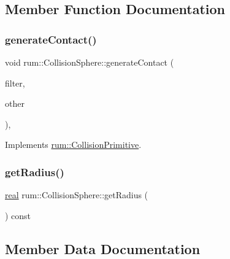 \subsection{Member Function Documentation}
\mbox{\label{classrum_1_1_collision_sphere_a4101051ee3213ce5257adcabd1529c00}} 
\subsubsection{\texorpdfstring{generate\+Contact()}{generateContact()}}
{\footnotesize\ttfamily void rum\+::\+Collision\+Sphere\+::generate\+Contact (\begin{DoxyParamCaption}\item[{\mbox{\hyperlink{classrum_1_1_i_narrow_phase_filter}{I\+Narrow\+Phase\+Filter}} $\ast$}]{filter,  }\item[{\mbox{\hyperlink{classrum_1_1_collision_primitive}{Collision\+Primitive}} $\ast$}]{other }\end{DoxyParamCaption})\hspace{0.3cm}{\ttfamily [override]}, {\ttfamily [virtual]}}



Implements \mbox{\hyperlink{classrum_1_1_collision_primitive_a31af51e97485378954de219b8411a27d}{rum\+::\+Collision\+Primitive}}.

\mbox{\label{classrum_1_1_collision_sphere_a9d415d951f290a51180db6a79cdb0245}} 
\subsubsection{\texorpdfstring{get\+Radius()}{getRadius()}}
{\footnotesize\ttfamily \mbox{\hyperlink{namespacerum_a7e8cca23573d5eaead0f138cbaa4862c}{real}} rum\+::\+Collision\+Sphere\+::get\+Radius (\begin{DoxyParamCaption}{ }\end{DoxyParamCaption}) const}



\subsection{Member Data Documentation}
\mbox{\label{classrum_1_1_collision_sphere_a191922b8ffb7ea87aa1caf915c563aad}} 
